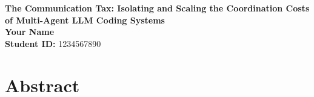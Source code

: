 \documentclass[11pt,a4paper]{article}
\begin{document}
\singlespacing  %
\thispagestyle{empty} %

\begin{center}
{\bf \LARGE The Communication Tax: Isolating and Scaling the Coordination Costs of Multi-Agent LLM Coding Systems}\\[0.5cm]
    \textbf{Your Name} \\[0.2cm]
    \textbf{Student ID:} 1234567890 \\[1cm]
\end{center}

\section*{Abstract}
\end{document}
